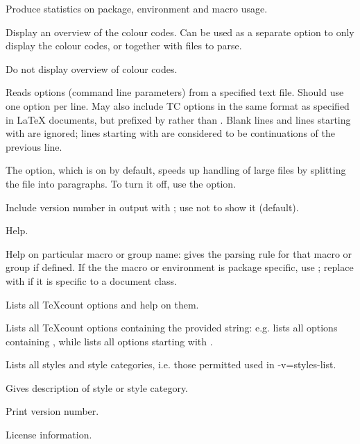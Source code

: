 \begin{description}
Produce statistics on package, environment and macro usage. 

\option[-codes]Display an overview of the colour codes. Can be used as a separate option to only display the colour codes, or together with files to parse.

\option[-nocodes]Do not display overview of colour codes.

\option[-opt=, -optionfile=]Reads options (command line parameters) from a specified text file. Should use one option per line. May also include TC options in the same format as specified in \LaTeX{} documents, but prefixed by \code{\%} rather than . Blank lines and lines starting with \code{\#} are ignored; lines starting with \code{\bs{}} are considered to be continuations of the previous line.

The  option, which is on by default, speeds up handling of large files by splitting the file into paragraphs. To turn it off, use the  option.

Include version number in output with ; use  not to show it (default). 

\option[-h, -?, --help, /?]Help.

\option[-h=, -?=, --help=, /?=]Help on particular macro or group name: gives the parsing rule for that macro or group if defined. If the the macro or environment is package specific, use ; replace  with  if it is specific to a document class.

Lists all TeXcount options and help on them.

\option[--help-option=, -h-opt=]Lists all TeXcount options containing the provided string: e.g.  lists all options containing , while  lists all options starting with .

Lists all styles and style categories, i.e. those permitted used in -v={styles-list}.

\option[-help-style=, -h-style=]Gives description of style or style category. 

Print version number.

License information.

\end{description}
